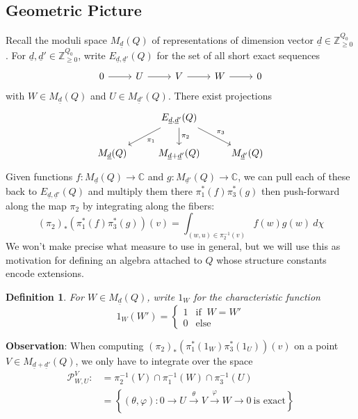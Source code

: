 \documentclass{book}
\newtheorem{definition}[theorem]{Definition}
\begin{document}
    	\subsection{Geometric Picture}
        	Recall the moduli space $M_{\underline{d}}(Q)$ of representations of dimension vector $\underline{d}\in \mathbb{Z}_{\geq 0}^{Q_0}$. For $\underline{d},\underline{d}'\in \mathbb{Z}_{\geq 0}^{Q_0}$, write $E_{\underline{d},\underline{d}'}(Q)$ for the set of all short exact sequences
            		\[ \begin{tikzcd}
				0 \arrow{r} & U \arrow{r} &V \arrow{r} &W \arrow{r} &0
			\end{tikzcd}\]
		with $W\in M_{\underline{d}}(Q)$ and $U\in M_{\underline{d}'}(Q)$. There exist projections
			\[ \begin{tikzcd} &\arrow{dl}{\pi_1} E_{\underline{d},\underline{d}'}(Q)\arrow{d}{\pi_2}\arrow{dr}{\pi_3}& \\
		    		M_{\underline{d}}(Q) & M_{\underline{d}+\underline{d}'}(Q) & M_{\underline{d}'}(Q)
			\end{tikzcd}\]
        	Given functions $f:M_{\underline{d}}(Q)\to \mathbb{C}$ and $g:M_{\underline{d}'}(Q)\to \mathbb{C}$, we can pull each of these back to $E_{\underline{d},\underline{d}'}(Q)$ and multiply them there $\pi_1^*(f)\pi_3^*(g)$ then push-forward along the map $\pi_2$ by integrating along the fibers:
        	\[(\pi_2)_*\left(\pi_1^*(f)\pi_3^*(g)\right)(v)=\int_{(w,u)\in \pi_2^{-1}(v)}f(w)g(w) \ d\chi\]
        	We won't make precise what measure to use in general, but we will use this as motivation for defining an algebra attached to $Q$ whose structure constants encode extensions.
    
    \begin{definition}
        For $W\in M_{\underline{d}}(Q)$, write $1_W$ for the characteristic function
        \[1_W(W') = \begin{cases} 
        1 & \text{if } \  W=W' \\
        0 & \text{else}
        \end{cases}\]
    \end{definition}
    
    \textbf{Observation}: When computing $(\pi_2)_*(\pi_1^*(1_W)\pi_3^*(1_U))(v)$ on a point $V\in M_{\underline{d}+\underline{d}'}(Q)$, we only have to integrate over the space 
    \begin{align*}
        \mathcal{P}_{W,U}^V :&= \pi_2^{-1}(V)\cap\pi_1^{-1}(W)\cap \pi_3^{-1}(U)\\
        &= \left\{ (\theta,\varphi): 
        0\to U\xrightarrow{\theta} V\xrightarrow{\varphi} W\to 0
        \ \text{is exact}\right\}
    \end{align*}
    
\end{document}
